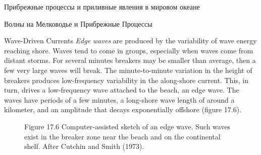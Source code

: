 \begin{chapter}{Прибрежные процессы и приливные явления в мировом океане}
\begin{section}{Волны на Мелководье и Прибрежные Процессы}
\begin{paragraph}{Wave-Driven Currents}
\textit{Edge waves} are produced by the
variability of wave energy reaching shore. Waves tend to come in
groups, especially when waves come from distant storms. For several
minutes breakers may be smaller than
average, then a few very large waves will break. The minute-to-minute
variation in the height of breakers produces low-frequency variability
in the along-shore current. This, in turn, drives a low-frequency wave
attached to the beach, an edge wave. The waves have periods of a few
minutes, a long-shore wave length of around a kilometer, and an
amplitude that decays exponentially offshore (figure 17.6).
%
\end{paragraph}

\begin{figure}[h!]
\caption{Figure 17.6 Computer-assisted sketch of an edge wave. Such
waves exist in the breaker zone near the beach and on the continental
shelf. After Cutchin and Smith (1973).}
\label{fig:edgewave}
\end{figure}
%
%
\end{section}


\end{chapter}
